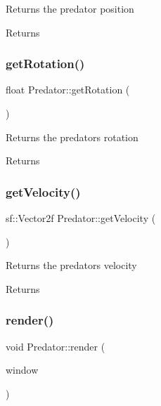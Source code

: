 Returns the predator position 

\begin{DoxyReturn}{Returns}

\end{DoxyReturn}
\mbox{\label{class_predator_ad181dbe8dae22c982a893c25b7cedc93}} 
\subsubsection{\texorpdfstring{getRotation()}{getRotation()}}
{\footnotesize\ttfamily float Predator\+::get\+Rotation (\begin{DoxyParamCaption}{ }\end{DoxyParamCaption})}



Returns the predators rotation 

\begin{DoxyReturn}{Returns}

\end{DoxyReturn}
\mbox{\label{class_predator_a64ef7e1c8e4f9060200d539ab8aeef9a}} 
\subsubsection{\texorpdfstring{getVelocity()}{getVelocity()}}
{\footnotesize\ttfamily sf\+::\+Vector2f Predator\+::get\+Velocity (\begin{DoxyParamCaption}{ }\end{DoxyParamCaption})}



Returns the predators velocity 

\begin{DoxyReturn}{Returns}

\end{DoxyReturn}
\mbox{\label{class_predator_acf84bdda5a2ad7120ae182fbeac59516}} 
\subsubsection{\texorpdfstring{render()}{render()}}
{\footnotesize\ttfamily void Predator\+::render (\begin{DoxyParamCaption}\item[{sf\+::\+Render\+Window \&}]{window }\end{DoxyParamCaption})}



